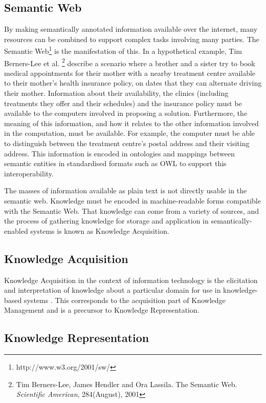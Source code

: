 \documentclass[a4paper]{report}
\begin{document}
\subsection{Semantic Web}

By making semantically annotated information available over the internet, many resources can be combined to support complex tasks involving many parties.
The Semantic Web\footnote{http://www.w3.org/2001/sw/} is the manifestation of this.
In a hypothetical example, Tim Berners-Lee et al. \footnote{Tim Berners-Lee, James Hendler and Ora Lassila. The Semantic Web. \emph{Scientific American}, 284(August), 2001} describe a scenario where a brother and a sister try to book medical appointments for their mother with a nearby treatment centre available to their mother's health insurance policy, on dates that they can alternate driving their mother.
Information about their availability, the clinics (including treatments they offer and their schedules) and the insurance policy must be available to the computers involved in proposing a solution.
Furthermore, the meaning of this information, and how it relates to the other information involved in the computation, must be available.
For example, the computer must be able to distinguish between the treatment centre's postal address and their visiting address.
This information is encoded in ontologies and mappings between semantic entities in standardised formats such as OWL\cite{OWLOverview2004} to support this interoperability.

The masses of information available as plain text is not directly usable in the semantic web.
Knowledge must be encoded in machine-readable forms compatible with the Semantic Web.
That knowledge can come from a variety of sources, and the process of gathering knowledge for storage and application in semantically-enabled systems is known as Knowledge Acquisition.

\subsection{Knowledge Acquisition}

Knowledge Acquisition in the context of information technology is the elicitation and interpretation of knowledge about a particular domain for use in knowledge-based systems \citep{anjewierden1987KATools}.
This corresponds to the acquisition part of Knowledge Management and is a precursor to Knowledge Representation. 

\subsection{Knowledge Representation}
\end{document}
